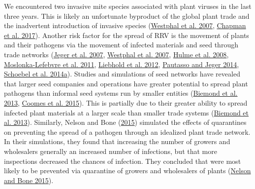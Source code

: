 \documentclass{ufdissertation}[overrideChapters] %
\begin{document}
{We encountered two invasive mite species associated with plant viruses in the last three years. This is likely an unfortunate byproduct of the global plant trade and the inadvertent introduction of invasive species (\protect\hyperlink{ref-Westphal2007}{Westphal et al. 2007}, \protect\hyperlink{ref-Chapman2017}{Chapman et al. 2017}). Another risk factor for the spread of RRV is the movement of plants and their pathogens via the movement of infected materials and seed through trade networks (\protect\hyperlink{ref-Jeger2007}{Jeger et al. 2007}, \protect\hyperlink{ref-Westphal2007}{Westphal et al. 2007}, \protect\hyperlink{ref-Hulme2008}{Hulme et al. 2008}, \protect\hyperlink{ref-MoslonkaLefebvre2011}{Moslonka-Lefebvre et al. 2011}, \protect\hyperlink{ref-Liebhold2012}{Liebhold et al. 2012}, \protect\hyperlink{ref-Pautasso2014}{Pautasso and Jeger 2014}, \protect\hyperlink{ref-Schoebel2014}{Schoebel et al. 2014a}). Studies and simulations of seed networks have revealed that larger seed companies and operations have greater potential to spread plant pathogens than informal seed systems run by smaller entities (\protect\hyperlink{ref-Biemond2013}{Biemond et al. 2013}, \protect\hyperlink{ref-Coomes2015}{Coomes et al. 2015}). This is partially due to their greater ability to spread infected plant materials at a larger scale than smaller trade systems (\protect\hyperlink{ref-Biemond2013}{Biemond et al. 2013}). Similarly, Nelson and Bone (\protect\hyperlink{ref-Nelson2015}{2015}) simulated the effects of quarantines on preventing the spread of a pathogen through an idealized plant trade network. In their simulations, they found that increasing the number of growers and wholesalers generally an increased number of infections, but that more inspections decreased the chances of infection. They concluded that were most likely to be prevented via quarantine of growers and wholesalers of plants (\protect\hyperlink{ref-Nelson2015}{Nelson and Bone 2015}).

\docBodyfalse
\setcounter{secnumdepth}{-1}



\setlength{\footskip}{4.2em}



}
\end{document}
